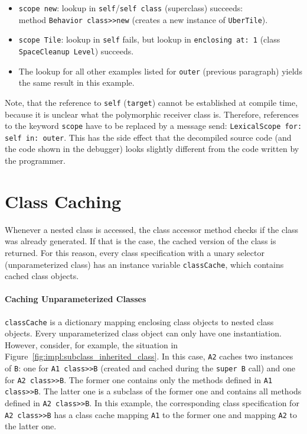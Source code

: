 \begin{itemize}
	\item \texttt{scope new}: lookup in \texttt{self}/\texttt{self class} (superclass) succeeds: \\ method \texttt{Behavior class>>new} (creates a new instance of \texttt{UberTile}).
	\item \texttt{scope Tile}: lookup in \texttt{self} fails, but lookup in \texttt{enclosing at: 1} (class \texttt{SpaceCleanup Level}) succeeds.
	\item The lookup for all other examples listed for \texttt{outer} (previous paragraph) yields the same result in this example.
\end{itemize}

Note, that the reference to \texttt{self} (\texttt{target}) cannot be established at compile time, because it is unclear what the polymorphic receiver class is. Therefore, references to the keyword \texttt{scope} have to be replaced by a message send: \texttt{LexicalScope for: self in: outer}. This has the side effect that the decompiled source code (and the code shown in the debugger) looks slightly different from the code written by the programmer.

\section{Class Caching}
\label{sec:impl_class_cache}
Whenever a nested class is accessed, the class accessor method checks if the class was already generated. If that is the case, the cached version of the class is returned. For this reason, every class specification with a unary selector (unparameterized class) has an instance variable \texttt{classCache}, which contains cached class objects. 

\paragraph{Caching Unparameterized Classes}
\texttt{classCache} is a dictionary mapping enclosing class objects to nested class objects. Every unparameterized class object can only have one instantiation. However, consider, for example, the situation in Figure~\ref{fig:impl:subclass_inherited_class}. In this case, \texttt{A2} caches two instances of \texttt{B}: one for \texttt{A1 class>>B} (created and cached during the \texttt{super B} call) and one for \texttt{A2 class>>B}. The former one contains only the methods defined in \texttt{A1 class>>B}. The latter one is a subclass of the former one and contains all methods defined in \texttt{A2 class>>B}. In this example, the corresponding class specification for \texttt{A2 class>>B} has a class cache mapping \texttt{A1} to the former one and mapping \texttt{A2} to the latter one.

